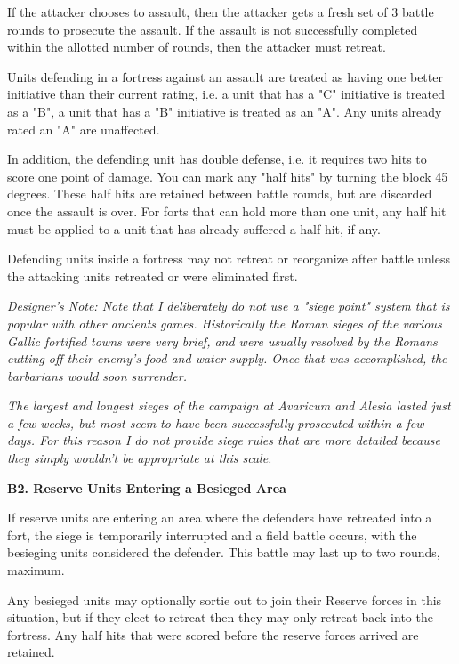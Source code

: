 If the attacker chooses to assault, then the attacker gets a fresh set of 3 battle rounds to prosecute the assault. If the assault is not successfully completed within the allotted number of rounds, then the attacker must retreat.

Units defending in a fortress against an assault are treated as having one better initiative than their current rating, i.e. a unit that has a "C" initiative is treated as a "B", a unit that has a "B" initiative is treated as an "A". Any units already rated an "A" are unaffected.

In addition, the defending unit has double defense, i.e. it requires two hits to score one point of damage. You can mark any "half hits" by turning the block 45 degrees. These half hits are retained between battle rounds, but are discarded once the assault is over. For forts that can hold more than one unit, any half hit must be applied to a unit that has already suffered a half hit, if any.

Defending units inside a fortress may not retreat or reorganize after battle unless the attacking units retreated or were eliminated first.

\textit{Designer's Note: Note that I deliberately do not use a "siege point" system that is popular with other ancients games. Historically the Roman sieges of the various Gallic fortified towns were very brief, and were usually resolved by the Romans cutting off their enemy's food and water supply. Once that was accomplished, the barbarians would soon surrender.}

\textit{The largest and longest sieges of the campaign at Avaricum and Alesia lasted just a few weeks, but most seem to have been successfully prosecuted within a few days. For this reason I do not provide siege rules that are more detailed because they simply wouldn't be appropriate at this scale.}

\textbf{B2. Reserve Units Entering a Besieged Area}

If reserve units are entering an area where the defenders have retreated into a fort, the siege is temporarily interrupted and a field battle occurs, with the besieging units considered the defender. This battle may last up to two rounds, maximum. 

Any besieged units may optionally sortie out to join their Reserve forces in this situation, but if they elect to retreat then they may only retreat back into the fortress. Any half hits that were scored before the reserve forces arrived are retained.

